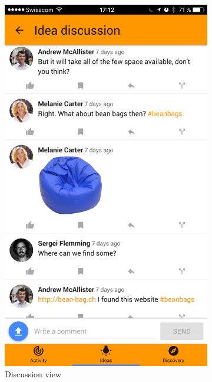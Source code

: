 \documentclass[a4paper,12pt,twoside]{article}
\begin{document}
\begin{figure}[!htb]
\begin{subfigure}[t]{.32\textwidth}
        \includegraphics[width=\textwidth]{images/ideaDiscussion.png}
        \caption{Discussion view}
        \label{fig.idea.discussion}
    \end{subfigure}
    \hfill
    \begin{subfigure}[t]{.32\textwidth}

\end{subfigure}
\end{figure}
\end{document}
